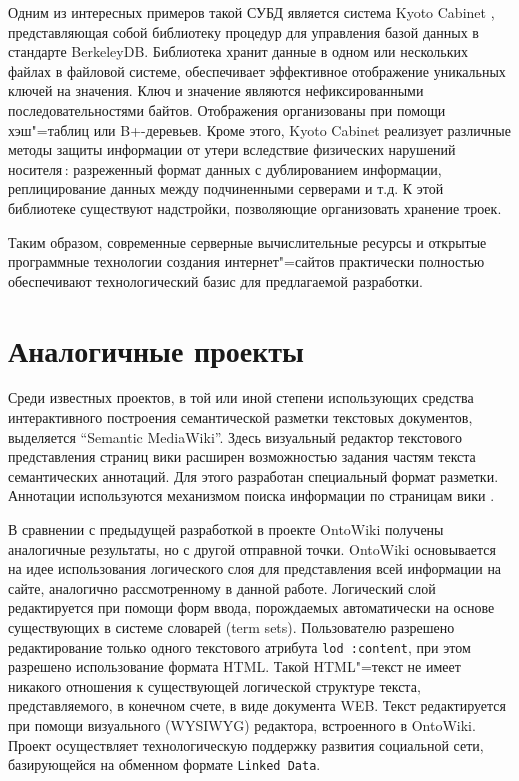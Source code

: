 \documentclass[utf8]{../IncArticle}
\begin{document}
Одним из интересных примеров такой СУБД является система Kyoto Cabinet
\cite{kyoto}, представляющая собой библиотеку процедур для управления
базой данных в стандарте BerkeleyDB. Библиотека хранит данные в одном
или нескольких файлах в файловой системе, обеспечивает эффективное
отображение уникальных ключей на значения.  Ключ и значение являются
нефиксированными последовательностями байтов.  Отображения
организованы при помощи хэш"=таблиц или B+-деревьев.  Кроме этого,
Kyoto Cabinet реализует различные методы защиты информации от утери
вследствие физических нарушений носителя\,: разреженный формат данных
с дублированием информации, реплицирование данных между подчиненными
серверами и т.д.  К этой библиотеке существуют надстройки, позволяющие
организовать хранение троек.

Таким образом, современные серверные вычислительные ресурсы и открытые
программные технологии создания интернет"=сайтов практически полностью
обеспечивают технологический базис для предлагаемой разработки.

\section{Аналогичные проекты}

Среди известных проектов, в той или иной степени использующих средства
интерактивного построения семантической разметки текстовых документов,
выделяется ``Semantic MediaWiki''.  Здесь визуальный редактор
текстового представления страниц вики расширен возможностью задания
частям текста семантических аннотаций.  Для этого разработан
специальный формат разметки.  Аннотации используются механизмом поиска
информации по страницам вики \cite{semwiki}.

В сравнении с предыдущей разработкой в проекте OntoWiki \cite{ontowiki}
получены аналогичные результаты, но с другой отправной точки.
OntoWiki основывается на идее использования логического слоя для
представления всей информации на сайте, аналогично рассмотренному в
данной работе.  Логический слой редактируется при помощи форм ввода,
порождаемых автоматически на основе существующих в системе словарей
(term sets).  Пользователю разрешено редактирование только одного
текстового атрибута \texttt{lod\,:content}, при этом разрешено
использование формата HTML. Такой HTML"=текст не имеет никакого
отношения к существующей логической структуре текста, представляемого,
в конечном счете, в виде документа WEB.  Текст редактируется при
помощи визуального (WYSIWYG) редактора, встроенного в OntoWiki.
Проект осуществляет технологическую поддержку развития социальной
сети, базирующейся на обменном формате \texttt{Linked Data}.
\end{document}
